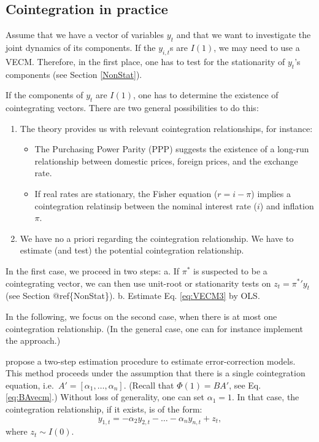 \documentclass[
  12pt,
]{book}
\providecommand{\tightlist}{%
  \setlength{\itemsep}{0pt}\setlength{\parskip}{0pt}}
\theoremstyle{definition}
\theoremstyle{definition}
\theoremstyle{definition}
\theoremstyle{definition}
\theoremstyle{remark}
\begin{document}
\hypertarget{cointegration-in-practice}{%
\subsection{Cointegration in practice}\label{cointegration-in-practice}}

Assume that we have a vector of variables \(y_t\) and that we want to investigate the joint dynamics of its components. If the \(y_{i,t}\)s are \(I(1)\), we may need to use a VECM. Therefore, in the first place, one has to test for the stationarity of \(y_t\)'s components (see Section \ref{NonStat}).

If the components of \(y_t\) are \(I(1)\), one has to determine the existence of cointegrating vectors. There are two general possibilities to do this:

\begin{enumerate}
\def\labelenumi{\arabic{enumi}.}
\tightlist
\item
  The theory provides us with relevant cointegration relationships, for instance:

  \begin{itemize}
  \tightlist
  \item
    The Purchasing Power Parity (PPP) suggests the existence of a long-run relationship between domestic prices, foreign prices, and the exchange rate.
  \item
    If real rates are stationary, the Fisher equation (\(r=i-\pi\)) implies a cointegration relatinsip between the nominal interest rate (\(i\)) and inflation \(\pi\).
  \end{itemize}
\item
  We have no a priori regarding the cointegration relationship. We have to estimate (and test) the potential cointegration relationship.
\end{enumerate}

In the first case, we proceed in two steps:
a. If \(\pi^*\) is suspected to be a cointegrating vector, we can then use unit-root or stationarity tests on \(z_t={\pi^*}' y_t\) (see Section @ref\{NonStat\}).
b. Estimate Eq. \eqref{eq:VECM3} by OLS.

In the following, we focus on the second case, when there is at most one cointegration relationship. (In the general case, one can for instance implement the \citet{Johansen_1991} approach.)

\citet{Engle_Granger_1987} propose a two-step estimation procedure to estimate error-correction models. This method proceeds under the assumption that there is a single cointegration equation, i.e.~\(A' = [\alpha_1,\dots,\alpha_n]\). (Recall that \(\Phi(1) = BA'\), see Eq. \eqref{eq:BAvecm}.) Without loss of generality, one can set \(\alpha_1=1\). In that case, the cointegration relationship, if it exists, is of the form:
\[
y_{1,t} = - \alpha_2 y_{2,t} - \dots - \alpha_n y_{n,t} + z_t,
\]
where \(z_t \sim I(0)\).
\end{document}
